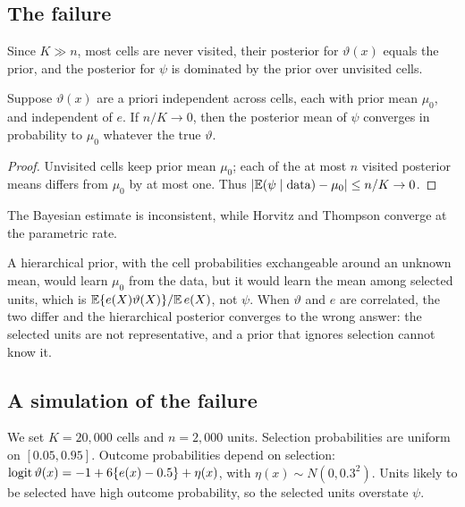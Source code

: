 \subsection{The failure}

Since $K \gg n$, most cells are never visited, their posterior for $\vartheta(x)$ equals the prior, and the posterior for $\psi$ is dominated by the prior over unvisited cells.

\begin{proposition}
Suppose $\vartheta(x)$ are a priori independent across cells, each with prior mean $\mu_0$, and independent of $e$. If $n/K \to 0$, then the posterior mean of $\psi$ converges in probability to $\mu_0$ whatever the true $\vartheta$.
\end{proposition}

\begin{proof}
Unvisited cells keep prior mean $\mu_0$; each of the at most $n$ visited posterior means differs from $\mu_0$ by at most one. Thus $|\mathbb{E}(\psi \mid \text{data}) - \mu_0| \leq n/K \to 0$.
\end{proof}

The Bayesian estimate is inconsistent, while Horvitz and Thompson converge at the parametric rate.

A hierarchical prior, with the cell probabilities exchangeable around an unknown mean, would learn $\mu_0$ from the data, but it would learn the mean among selected units, which is $\mathbb{E}\{e(X)\vartheta(X)\}/\mathbb{E}\,e(X)$, not $\psi$. When $\vartheta$ and $e$ are correlated, the two differ and the hierarchical posterior converges to the wrong answer: the selected units are not representative, and a prior that ignores selection cannot know it.

\subsection{A simulation of the failure}

We set $K = 20{,}000$ cells and $n = 2{,}000$ units. Selection probabilities are uniform on $[0.05, 0.95]$. Outcome probabilities depend on selection: $\operatorname{logit}\vartheta(x) = -1 + 6\{e(x) - 0.5\} + \eta(x)$, with $\eta(x) \sim N(0, 0.3^2)$. Units likely to be selected have high outcome probability, so the selected units overstate $\psi$.

